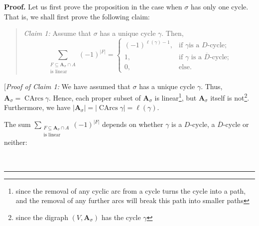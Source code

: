 \documentclass[numbers=enddot,12pt,final,onecolumn,notitlepage]{scrartcl}%
\numberwithin{exer}{section}
\theoremstyle{definition}
\newenvironment{statement}{\begin{quote}}{\end{quote}}
\newenvironment{proof}[1][Proof]{\noindent\textbf{#1.} }{\ \rule{0.5em}{0.5em}}
\let\sumnonlimits\sum
\renewcommand{\sum}{\sumnonlimits\limits}
\newenvironment{vershort}{}{}
\begin{document}
\begin{vershort}
\begin{proof}
Let us first prove the proposition in the case when $\sigma$ has only one
cycle. That is, we shall first prove the following claim:

\begin{statement}
\textit{Claim 1:} Assume that $\sigma$ has a unique cycle $\gamma$. Then,%
\[
\sum_{\substack{F\subseteq\mathbf{A}_{\sigma}\cap A\\\text{is linear}}}\left(
-1\right)  ^{\left\vert F\right\vert }=%
\begin{cases}
\left(  -1\right)  ^{\ell\left(  \gamma\right)  -1}, & \text{if }\gamma\text{
is a }D\text{-cycle;}\\
1, & \text{if }\gamma\text{ is a }\overline{D}\text{-cycle;}\\
0, & \text{else.}%
\end{cases}
\]

\end{statement}

[\textit{Proof of Claim 1:} We have assumed that $\sigma$ has a unique cycle
$\gamma$. Thus, $\mathbf{A}_{\sigma}=\operatorname*{CArcs}\gamma$. Hence, each
proper subset of $\mathbf{A}_{\sigma}$ is linear\footnote{since the removal of
any cyclic arc from a cycle turns the cycle into a path, and the removal of
any further arcs will break this path into smaller paths}, but $\mathbf{A}%
_{\sigma}$ itself is not\footnote{since the digraph $\left(  V,\mathbf{A}%
_{\sigma}\right)  $ has the cycle $\gamma$}. Furthermore, we have $\left\vert
\mathbf{A}_{\sigma}\right\vert =\left\vert \operatorname*{CArcs}%
\gamma\right\vert =\ell\left(  \gamma\right)  $.

The sum $\sum_{\substack{F\subseteq\mathbf{A}_{\sigma}\cap A\\\text{is
linear}}}\left(  -1\right)  ^{\left\vert F\right\vert }$ depends on whether
$\gamma$ is a $D$-cycle, a $\overline{D}$-cycle or neither:


\end{proof}
\end{vershort}
\end{document}

